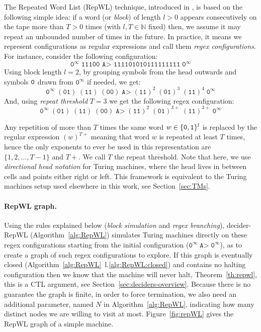 The Repeated Word List (RepWL) technique, introduced in \CoqBB, is based on the following simple idea: if a word (or \textit{block}) of length $l > 0$ appears consecutively on the tape more than $T > 0$ times (with $l, T \in \mathbb{N}$ fixed) then, we assume it may repeat an unbounded number of times in the future. In practice, it means we represent configurations as regular expressions and call them \textit{regex configurations}. For instance, consider the following configuration:
$$ \texttt{0}^\infty \; \texttt{11100 A> 111101010111111111} \; \texttt{0}^\infty$$
Using block length $l=2$, by grouping symbols from the head outwards and symbols $\texttt{0}$ drawn from $\texttt{0}^\infty$ if needed, we get:
$$ \texttt{0}^\infty \; (\texttt{01}) \; (\texttt{11}) \; (\texttt{00}) \; \texttt{A>} \; (\texttt{11})^2 \; (\texttt{01})^{3} \; (\texttt{11})^{4} \; \texttt{0}^\infty $$
And, using \textit{repeat threshold} $T=3$ we get the following regex configuration:
$$ \texttt{0}^\infty \; (\texttt{01}) \; (\texttt{11}) \; (\texttt{00}) \; \texttt{A>} \; (\texttt{11})^2 \; (\texttt{01})^{3+} \; (\texttt{11})^{3+} \; \texttt{0}^\infty $$

Any repetition of more than $T$ times the same word $w \in \{\texttt{0},\texttt{1}\}^l$ is replaced by the regular expression $(w)^{T+}$ meaning that word $w$ is repeated at least $T$ times, hence the only exponents to ever be used in this representation are $\{1,2,\dots,T-1\}$ and $T+$. We call $T$ the repeat threshold. Note that here, we use \textit{directional head notation} for Turing machines, where the head lives in between cells and points either right or left. This framework is equivalent to the Turing machines setup used elsewhere in this work, see Section~\ref{sec:TMs}.

\paragraph{RepWL graph.} Using the rules explained below (\textit{block simulation} and \textit{regex branching}), {\sc decider-RepWL} (Algorithm~\ref{alg:RepWL}) simulates Turing machines directly on these regex configurations starting from the initial configuration (\ie $\texttt{0}^\infty \; \texttt{A>} \; \texttt{0}^\infty$), as to create a graph of such regex configurations to explore. If this graph is eventually closed (Algorithm~\ref{alg:RepWL}~l.\ref{alg:RepWL:closed}) and contains no halting configuration then we know that the machine will never halt, Theorem~\ref{th:repwl}, this is a CTL argument, see Section~\ref{sec:deciders-overview}. Because there is no guarantee the graph is finite, in order to force termination, we also need an additional parameter, named $N$ in Algorithm~\ref{alg:RepWL}, indicating how many distinct nodes we are willing to visit at most. Figure~\ref{fig:repWL} gives the RepWL graph of a simple machine.

